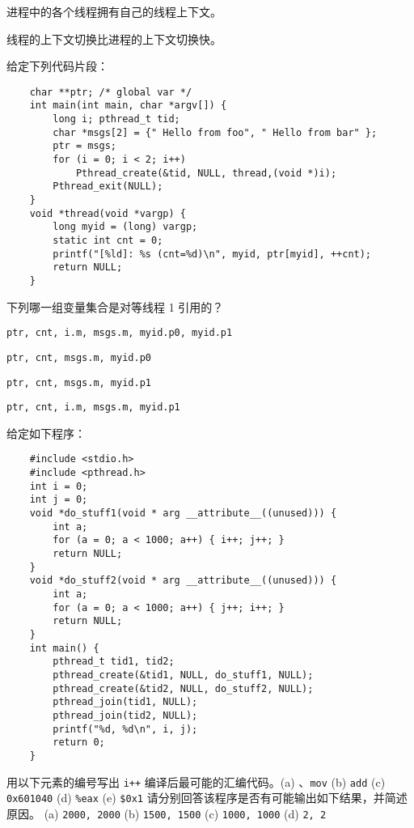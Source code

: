 \begin{problems}
\begin{choices}
            \item 进程中的各个线程拥有自己的线程上下文。
            \item 线程的上下文切换比进程的上下文切换快。
        \end{choices}
         给定下列代码片段：
        \begin{verbatim}
    char **ptr; /* global var */
    int main(int main, char *argv[]) {
        long i; pthread_t tid;
        char *msgs[2] = {" Hello from foo", " Hello from bar" };
        ptr = msgs;
        for (i = 0; i < 2; i++)
            Pthread_create(&tid, NULL, thread,(void *)i);
        Pthread_exit(NULL);
    }
    void *thread(void *vargp) {
        long myid = (long) vargp;
        static int cnt = 0;
        printf("[%ld]: %s (cnt=%d)\n", myid, ptr[myid], ++cnt);
        return NULL;
    }
        \end{verbatim}
        下列哪一组变量集合是对等线程 1 引用的？
        \begin{choices}
            \item \verb|ptr, cnt, i.m, msgs.m, myid.p0, myid.p1|
            \item \verb|ptr, cnt, msgs.m, myid.p0|
            \item \verb|ptr, cnt, msgs.m, myid.p1|
            \item \verb|ptr, cnt, i.m, msgs.m, myid.p1|
        \end{choices}
         给定如下程序：
        \begin{verbatim}
    #include <stdio.h>
    #include <pthread.h>
    int i = 0;
    int j = 0;
    void *do_stuff1(void * arg __attribute__((unused))) {
        int a;
        for (a = 0; a < 1000; a++) { i++; j++; }
        return NULL;
    }
    void *do_stuff2(void * arg __attribute__((unused))) {
        int a;
        for (a = 0; a < 1000; a++) { j++; i++; }
        return NULL;
    }
    int main() {
        pthread_t tid1, tid2;
        pthread_create(&tid1, NULL, do_stuff1, NULL);
        pthread_create(&tid2, NULL, do_stuff2, NULL);
        pthread_join(tid1, NULL);
        pthread_join(tid2, NULL);
        printf("%d, %d\n", i, j);
        return 0;
    }
        \end{verbatim}
            \qn 用以下元素的编号写出  \verb|i++| 编译后最可能的汇编代码。(a) 、\verb|mov| (b) \verb|add| (c) \verb|0x601040| (d) \verb|%eax| (e) \verb|$0x1|
            \qn 请分别回答该程序是否有可能输出如下结果，并简述原因。 (a) \verb|2000, 2000| (b) \verb|1500, 1500| (c) \verb|1000, 1000| (d) \verb|2, 2|

\end{problems}
